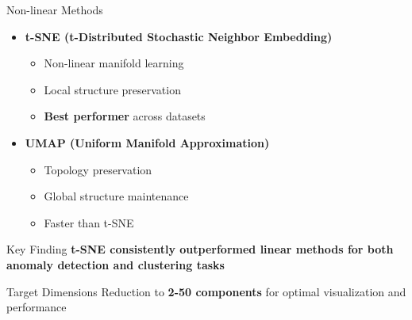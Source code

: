 \documentclass[aspectratio=43]{beamer}
\begin{document}
\begin{frame}
\begin{columns}
        \begin{column}{0.5\textwidth}
            \begin{block}{Non-linear Methods}
                \begin{itemize}
                    \item \textbf{t-SNE (t-Distributed Stochastic Neighbor Embedding)}
                        \begin{itemize}
                            \item Non-linear manifold learning
                            \item Local structure preservation
                            \item \textbf{Best performer} across datasets
                        \end{itemize}
                    \item \textbf{UMAP (Uniform Manifold Approximation)}
                        \begin{itemize}
                            \item Topology preservation
                            \item Global structure maintenance
                            \item Faster than t-SNE
                        \end{itemize}
                \end{itemize}
            \end{block}
            
            \begin{alertblock}{Key Finding}
                \textbf{t-SNE consistently outperformed linear methods for both anomaly detection and clustering tasks}
            \end{alertblock}
            
            \begin{exampleblock}{Target Dimensions}
                Reduction to \textbf{2-50 components} for optimal visualization and performance
            \end{exampleblock}
        \end{column}
    \end{columns}
\end{frame}
\end{document}
